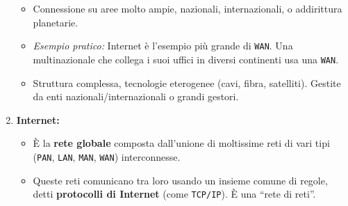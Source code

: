 \begin{enumerate}
    \begin{itemize}
        \item Connessione su aree molto ampie, nazionali, internazionali, o addirittura planetarie.
        \item \textit{Esempio pratico:} Internet è l'esempio più grande di \texttt{WAN}. Una multinazionale che collega i suoi uffici in diversi continenti usa una \texttt{WAN}.
        \item Struttura complessa, tecnologie eterogenee (cavi, fibra, satelliti). Gestite da enti nazionali/internazionali o grandi gestori.
    \end{itemize}
    \item \textbf{Internet:}
    \begin{itemize}
        \item È la \textbf{rete globale} composta dall'unione di moltissime reti di vari tipi (\texttt{PAN}, \texttt{LAN}, \texttt{MAN}, \texttt{WAN}) interconnesse.
        \item Queste reti comunicano tra loro usando un insieme comune di regole, detti \textbf{protocolli di Internet} (come \texttt{TCP/IP}). È una “rete di reti”.
    \end{itemize}
\end{enumerate}

